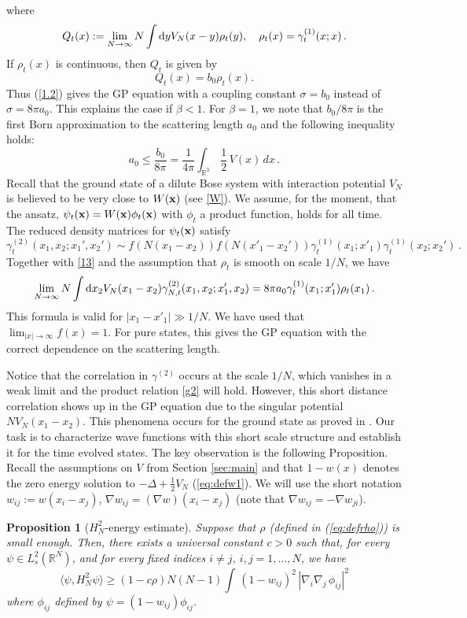 \documentclass[11pt]{article}
\newtheorem{proposition}[theorem]{Proposition}
\newcommand{\rd}{{\rm d}}
\newcommand{\be}{\begin{equation}}
\newcommand{\ee}{\end{equation}}
\newcommand{\bx}{{\bf x}}
\newcommand{\bR}{{\mathbb R}}
\begin{document}
where \be\label{b0} Q_t(x) := \lim_{N \to \infty} N \int \rd y
V_N(x-y) \rho_t(y), \quad \rho_t(x) = \gamma_{t}^{(1)} ({x}; {x})\,
. \ee If $\rho_t(x)$ is continuous, then $Q_t$ is given by
$$
Q_t(x) = b_0 \rho_t(x) .
$$
Thus (\ref{1.2})
 gives the GP equation with  a coupling constant
$\sigma = b_0$ instead of $\sigma = 8\pi a_0$. This explains the
case if $\beta< 1$. For $\beta=1$, we note that  $b_0/8 \pi $ is the
first Born approximation to the scattering length $a_0$  and the
following inequality holds: \be\label{slbound} a_0 \le \frac {b_0}{8
\pi}= \frac 1 {4 \pi} \int_{\bR^3} \,  \frac  1 2 \, V (x) \, dx \,
. \ee Recall that the ground state of a dilute Bose system with
interaction potential $V_N$ is believed  to be very close to $
 W (\bx)$ (see \eqref{W}).
We assume, for the moment, that the ansatz,  $\psi_t (\bx) = W(\bx)
\phi_t (\bx)$ with $\phi_t$ a product function, holds  for all time.
The reduced density matrices for $\psi_t (\bx) $ satisfy
\be\label{g3}
\gamma^{(2)}_t (x_1, x_2; x_1', x_2')\sim
f(N(x_1-x_2))f(N(x'_1-x_2')) \gamma_{t}^{(1)} ({x}_1;
{x}'_1)\gamma_t^{(1)}(x_2; x_2')\,.
\ee
Together with \eqref{13} and
the assumption that $\rho_t$ is smooth on scale $1/N$, we have
\be\label{g4}
\lim_{N \to \infty}  N \int \rd x_{2} V_N (x_1 - x_{2})
\gamma_{N,t}^{(2)} ({x}_1 , x_{2} ; {x}'_1 , x_{2}) = 8 \pi a_0
\gamma_{t}^{(1)} ({x}_1; {x}'_1) \rho_t(x_1) \, .
\ee
This formula
is valid for $|x_1-x'_1|\gg 1/N$.  We have used that $\lim_{|x| \to
\infty} f (x) =1$. For pure states,
this gives the GP equation with the correct
dependence on the scattering length.

Notice that the correlation in $\gamma^{(2)}$ occurs at the scale
$1/N$, which vanishes  in a weak limit and the product relation
\eqref{g2} will hold. However, this short distance correlation shows
up in the GP equation due to the singular potential $N V_N (x_1 -
x_{2})$.  This phenomena occurs for the ground state as proved in
\cite{LSY1}. Our task is to characterize wave functions with this
short scale structure and establish it for the time evolved states.
The key observation is the following Proposition. Recall the
assumptions on $V$ from Section \ref{sec:main} and
 that $1-w(x)$ denotes the zero energy solution to
 $-\Delta + \frac{1}{2}V_{N}$  (\ref{eq:defw1}).
 We will use the short notation $w_{ij}:= w(x_i-x_j)$, $\nabla
w_{ij} = (\nabla w) (x_i - x_j)$ (note that $\nabla w_{ij} = -
\nabla w_{ji}$).

\begin{proposition}[$H_N^2$-energy estimate]\label{prop:H2}
Suppose that $\rho$ (defined in (\ref{eq:defrho})) is small enough.
Then, there exists a universal constant $c>0$ such that, for every
$\psi \in L^2_s (\bR^N)$, and for every fixed indices $i \neq j$,
$i,j =1,\dots ,N$, we have
\begin{equation}\label{eq:H2}
\langle \psi, H_N^2 \psi \rangle \geq (1- c\rho) N(N-1) \int \,
\left( 1- w_{ij}\right)^2 \, |\nabla_i \nabla_j \, \phi_{ij}|^2
\end{equation}
where $\phi_{ij}$ defined by $\psi = (1- w_{ij}) \phi_{ij}$.
\end{proposition}
\end{document}
